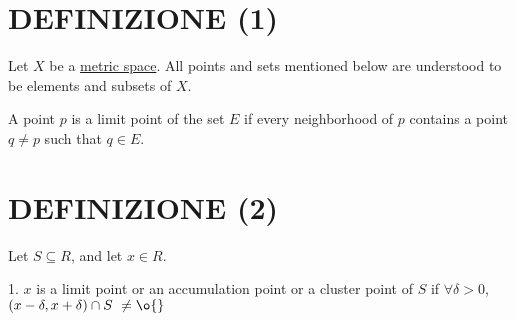 
\section{DEFINIZIONE (1)}
Let $X$ be a \href{MetricSpace.html}{metric space}. All points and sets mentioned below are understood to be elements and subsets of $X$.

A point $p$ is a limit point of the set $E$ if every neighborhood of $p$ contains a point $q \ne p$ such that $q \in E$.

\section{DEFINIZIONE (2)}
Let $S \subseteq R$, and let $x \in R$.

1. $x$ is a limit point or an accumulation point or a cluster point of $S$ if $\forall \delta > 0$, $(x-\delta,x+\delta) \cap S \ \ne \o{}$
